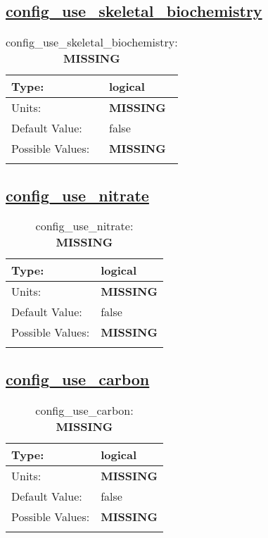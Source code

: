 \subsection[config\_use\_skeletal\_biochemistry]{\hyperref[sec:nm_tab_biogeochemistry]{config\_use\_skeletal\_biochemistry}}
\label{subsec:nm_sec_config_use_skeletal_biochemistry}
\begin{center}
\begin{longtable}{| p{2.0in} || p{4.0in} |}
    \hline
    Type: & logical \\
    \hline
    Units: & {\bf \color{red} MISSING} \\
    \hline
    Default Value: & false \\
    \hline
    Possible Values: & {\bf \color{red} MISSING} \\
    \hline
    \caption{config\_use\_skeletal\_biochemistry: {\bf \color{red} MISSING}}
\end{longtable}
\end{center}
\subsection[config\_use\_nitrate]{\hyperref[sec:nm_tab_biogeochemistry]{config\_use\_nitrate}}
\label{subsec:nm_sec_config_use_nitrate}
\begin{center}
\begin{longtable}{| p{2.0in} || p{4.0in} |}
    \hline
    Type: & logical \\
    \hline
    Units: & {\bf \color{red} MISSING} \\
    \hline
    Default Value: & false \\
    \hline
    Possible Values: & {\bf \color{red} MISSING} \\
    \hline
    \caption{config\_use\_nitrate: {\bf \color{red} MISSING}}
\end{longtable}
\end{center}
\subsection[config\_use\_carbon]{\hyperref[sec:nm_tab_biogeochemistry]{config\_use\_carbon}}
\label{subsec:nm_sec_config_use_carbon}
\begin{center}
\begin{longtable}{| p{2.0in} || p{4.0in} |}
    \hline
    Type: & logical \\
    \hline
    Units: & {\bf \color{red} MISSING} \\
    \hline
    Default Value: & false \\
    \hline
    Possible Values: & {\bf \color{red} MISSING} \\
    \hline
    \caption{config\_use\_carbon: {\bf \color{red} MISSING}}
\end{longtable}
\end{center}
